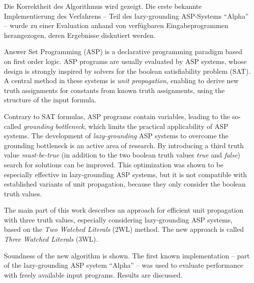 \documentclass{vutinfth} %
\newcommand{\mbt}{must-be-true\xspace}
\begin{document}
\begin{kurzfassung*}
Die Korrektheit des Algorithmus wird gezeigt. Die erste bekannte Implementierung des Verfahrens -- Teil des lazy-grounding ASP-Systems \enquote{Alpha} -- wurde zu einer Evaluation anhand von  verfügbaren Eingabeprogrammen herangezogen, deren Ergebnisse diskutiert werden.
\end{kurzfassung*}


\begin{abstract*}
Answer Set Programming (ASP) is a declarative programming paradigm based on first order logic. ASP programs are usually evaluated by ASP systems, whose design is strongly inspired by solvers for the boolean satisfiability problem (SAT). A central method in these systems is \emph{unit propagation}, enabling to derive new truth assignments for constants from known truth assignments, using the structure of the input formula.

Contrary to SAT formulas, ASP programs contain variables, leading to the so-called \emph{grounding bottleneck}, which limits the practical applicability of ASP systems. The development of \emph{lazy-grounding} ASP systems to overcome the grounding bottleneck is an active area of research. By introducing a third truth value \emph{\mbt} (in addition to the two boolean truth values \emph{true} and \emph{false}) search for solutions can be improved. This optimization was shown to be especially effective in lazy-grounding ASP systems, but it is not compatible with established variants of unit propagation, because they only consider the boolean truth values.

The main part of this work describes an approach for efficient unit propagation with three truth values, especially considering lazy-grounding ASP systems, based on the \emph{Two Watched Literals} (2WL) method. The new approach is called \emph{Three Watched Literals} (3WL).

Soundness of the new algorithm is shown. The first known implementation -- part of the lazy-grounding ASP system \enquote{Alpha} -- was used to evaluate performance with freely available input programs. Results are discussed.
\end{abstract*}
\end{document}
